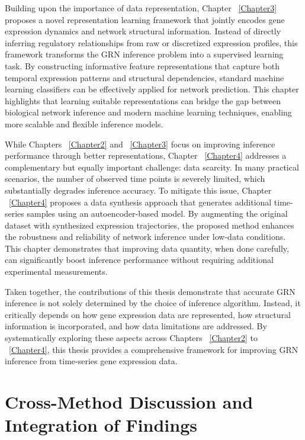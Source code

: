 Building upon the importance of data representation, Chapter ~\ref{Chapter3} proposes a novel representation learning framework that jointly encodes gene expression dynamics and network structural information. Instead of directly inferring regulatory relationships from raw or discretized expression profiles, this framework transforms the GRN inference problem into a supervised learning task. By constructing informative feature representations that capture both temporal expression patterns and structural dependencies, standard machine learning classifiers can be effectively applied for network prediction. This chapter highlights that learning suitable representations can bridge the gap between biological network inference and modern machine learning techniques, enabling more scalable and flexible inference models.

While Chapters ~\ref{Chapter2} and ~\ref{Chapter3} focus on improving inference performance through better representations, Chapter ~\ref{Chapter4} addresses a complementary but equally important challenge: data scarcity. In many practical scenarios, the number of observed time points is severely limited, which substantially degrades inference accuracy. To mitigate this issue, Chapter ~\ref{Chapter4} proposes a data synthesis approach that generates additional time-series samples using an autoencoder-based model. By augmenting the original dataset with synthesized expression trajectories, the proposed method enhances the robustness and reliability of network inference under low-data conditions. This chapter demonstrates that improving data quantity, when done carefully, can significantly boost inference performance without requiring additional experimental measurements.

Taken together, the contributions of this thesis demonstrate that accurate GRN inference is not solely determined by the choice of inference algorithm. Instead, it critically depends on how gene expression data are represented, how structural information is incorporated, and how data limitations are addressed. By systematically exploring these aspects across Chapters ~\ref{Chapter2} to ~\ref{Chapter4}, this thesis provides a comprehensive framework for improving GRN inference from time-series gene expression data.


\section{Cross-Method Discussion and Integration of Findings}

